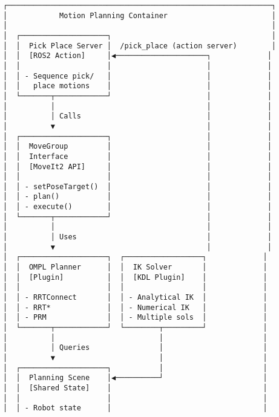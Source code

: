 \documentclass[
]{article}
\begin{document}
\begin{verbatim}
┌─────────────────────────────────────────────────────────────┐
│            Motion Planning Container                        │
│                                                             │
│  ┌────────────────────┐                                     │
│  │  Pick Place Server │  /pick_place (action server)        │
│  │  [ROS2 Action]     │◀─────────────────────┐             │
│  │                    │                      │             │
│  │ - Sequence pick/   │                      │             │
│  │   place motions    │                      │             │
│  └───────┬────────────┘                      │             │
│          │                                   │             │
│          │ Calls                             │             │
│          ▼                                   │             │
│  ┌────────────────────┐                      │             │
│  │  MoveGroup         │                      │             │
│  │  Interface         │                      │             │
│  │  [MoveIt2 API]     │                      │             │
│  │                    │                      │             │
│  │ - setPoseTarget()  │                      │             │
│  │ - plan()           │                      │             │
│  │ - execute()        │                      │             │
│  └───────┬────────────┘                      │             │
│          │                                   │             │
│          │ Uses                              │             │
│          ▼                                   │             │
│  ┌────────────────────┐  ┌──────────────────┐             │
│  │  OMPL Planner      │  │  IK Solver       │             │
│  │  [Plugin]          │  │  [KDL Plugin]    │             │
│  │                    │  │                  │             │
│  │ - RRTConnect       │  │ - Analytical IK  │             │
│  │ - RRT*             │  │ - Numerical IK   │             │
│  │ - PRM              │  │ - Multiple sols  │             │
│  └───────┬────────────┘  └────────┬─────────┘             │
│          │                        │                       │
│          │ Queries                │                       │
│          ▼                        │                       │
│  ┌────────────────────┐           │                       │
│  │  Planning Scene    │◀──────────┘                       │
│  │  [Shared State]    │                                   │
│  │                    │                                   │
│  │ - Robot state      │                                   │

\end{verbatim}
\end{document}
